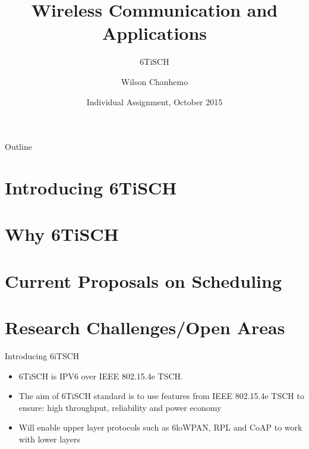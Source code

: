 \documentclass{beamer}
\title{Wireless Communication and Applications}
\subtitle{6TiSCH}
\author{Wilson Chanhemo}
\institute[University of Dodoma] %
\date{Individual Assignment, October 2015}
\begin{document}
\begin{frame}
  \titlepage
\end{frame}

\begin{frame}{Outline}
  \tableofcontents
\end{frame}

\section{Introducing 6TiSCH}
\section{Why 6TiSCH}
\section{Current Proposals on Scheduling}
\section{Research Challenges/Open Areas}
\begin{frame}{Introducing 6iTSCH}
  \begin{itemize}
  \item {
   6TiSCH is IPV6 over IEEE 802.15.4e TSCH.
  }
  \item {
    The aim of 6TiSCH standard is to use features from IEEE 802.15.4e TSCH to ensure:
    high throughput, reliability and power economy}
    	\item {
    		Will enable upper layer protocols such as 6loWPAN, RPL and CoAP to work with lower layers	}
  \end{itemize}
\end{frame}
\end{document}
